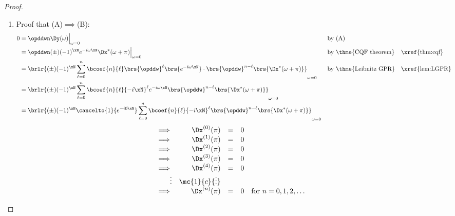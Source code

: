 \begin{proof}
\begin{enumerate}
  \item Proof that (A)$\implies$(B):
    \begin{align*}
      0
        &= \opddwn\Dy(\omega)\Big|_{\omega=0}
        && \text{by (A)}
      \\&= \opddwn(\pm)(-1)^\xN e^{-i\omega\xN}\Dx^\ast(\omega+\pi)\Big|_{\omega=0}
        && \text{by \thme{CQF theorem}}
        && \text{\xref{thm:cqf}}
      \\&= \brlr{(\pm)(-1)^\xN \sum_{\ell=0}^n \bcoef{n}{\ell} \brs{\opddw}^\ell\brs{e^{-i\omega\xN}}\cdot\brs{\opddw}^{n-\ell}\brs{\Dx^\ast(\omega+\pi)}}_{\omega=0}
        && \text{by \thme{Leibnitz GPR}}
        && \text{\xref{lem:LGPR}}
      \\&= \brlr{(\pm)(-1)^\xN
                 \sum_{\ell=0}^n \bcoef{n}{\ell} {-i\xN}^\ell e^{-i\omega\xN}\brs{\opddw}^{n-\ell}\brs{\Dx^\ast(\omega+\pi)}
                }_{\omega=0}
      \\&= \brlr{(\pm)(-1)^\xN  \cancelto{1}{e^{-i0\xN}} \sum_{\ell=0}^n \bcoef{n}{\ell} {-i\xN}^\ell \brs{\opddw}^{n-\ell}\brs{\Dx^\ast(\omega+\pi)}}_{\omega=0}
    \end{align*}
  \[\begin{array}{r rcl l}
    \implies & \Dx^{(0)}(\pi) &=& 0 \\
    \implies & \Dx^{(1)}(\pi) &=& 0 \\
    \implies & \Dx^{(2)}(\pi) &=& 0 \\
    \implies & \Dx^{(3)}(\pi) &=& 0 \\
    \implies & \Dx^{(4)}(\pi) &=& 0 \\
    \vdots   & \mc{1}{c}{\vdots}    \\
    \implies & \Dx^{(n)}(\pi) &=& 0 & \text{for $n=0,1,2,\ldots$}
  \end{array}\]


\end{enumerate}
\end{proof}
